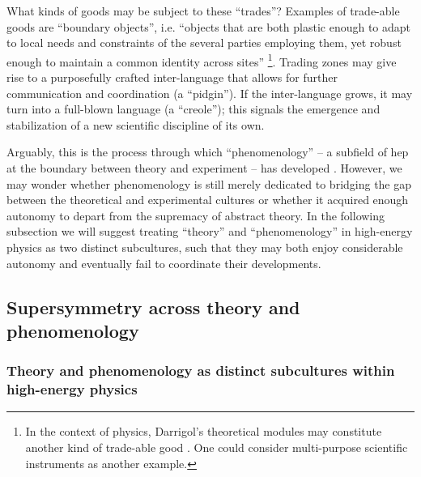 \documentclass[smallextended]{svjour3}
\begin{document}
What kinds of goods may be subject to these ``trades''? Examples of trade-able goods are ``boundary objects'', i.e. ``objects that are both plastic enough to adapt to local needs and constraints of the several parties employing them, yet robust enough to maintain a common identity across sites'' \citep[p.~393]{Star1989}\footnote{In the context of physics, Darrigol's theoretical modules may constitute another kind of trade-able good \citep[p.~214]{Darrigol2007}. One could consider multi-purpose scientific instruments \citep[pp.~179--182]{Shinn2005} as another example.}. Trading zones may give rise to a purposefully crafted inter-language that allows for further communication and coordination (a ``pidgin''). If the inter-language grows, it may turn into a full-blown language (a ``creole''); this signals the emergence and stabilization of a new scientific discipline of its own. 

Arguably, this is the process through which ``phenomenology'' -- a subfield of \gls{hep} at the boundary between theory and experiment -- has developed \citep[p.~837]{galison1997image}. However, we may wonder whether phenomenology is still merely dedicated to bridging the gap between the theoretical and experimental cultures or whether it acquired enough autonomy to depart from the supremacy of abstract theory. In the following subsection we will suggest treating ``theory'' and ``phenomenology'' in high-energy physics as two distinct subcultures, such that they may both enjoy considerable autonomy and eventually fail to coordinate their developments.

\subsection{Supersymmetry across theory and phenomenology}
\label{section:hep_susy}

\subsubsection{Theory and phenomenology as distinct subcultures within high-energy physics}
\end{document}

